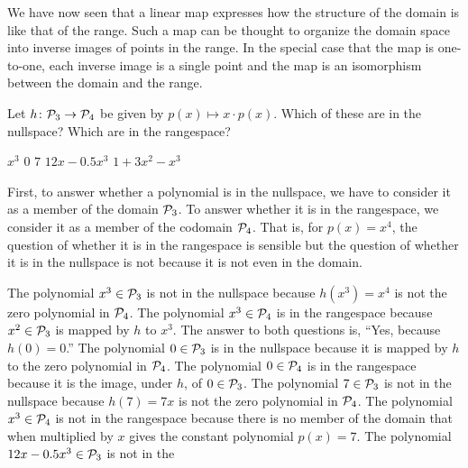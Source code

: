 We have now seen that a linear map
expresses how the structure of the domain is like that of the range.
Such a map can be thought to organize the domain space into
inverse images of points in the range.
In the special case that the map is one-to-one, each inverse image is a single
point and the map is an isomorphism between the domain and the range.


\begin{exercises}
  \recommended \item 
    Let \( \mbox{$h\colon \mathcal{P}_3\to \mathcal{P}_4$} \) be
    given by \( p(x)\mapsto x\cdot p(x) \).
    Which of these are in the nullspace?
    Which are in the rangespace?
    \begin{exparts*}
      \partsitem \( x^3 \)
      \partsitem \( 0 \)
      \partsitem \( 7 \)
      \partsitem \( 12x-0.5x^3 \)
      \partsitem \( 1+3x^2-x^3 \)
    \end{exparts*}
    \begin{answer}
      First, to answer whether a polynomial is in the nullspace, 
      we have to consider it as a member of the domain $\mathcal{P}_3$.
      To answer whether it is in the rangespace, we consider it as a member of
      the codomain $\mathcal{P}_4$.
      That is, for $p(x)=x^4$, the question of whether it is in the rangespace
      is sensible but the question of whether it is in the nullspace is not
      because it is not even in the domain.
      \begin{exparts}
        \partsitem The polynomial $x^3\in\mathcal{P}_3$ is not in the nullspace
            because $h(x^3)=x^4$ is not the zero polynomial in $\mathcal{P}_4$.
            The polynomial $x^3\in\mathcal{P}_4$ is in the rangespace because
            $x^2\in\mathcal{P}_3$ is mapped by $h$ to $x^3$.
        \partsitem The answer to both questions is, ``Yes, because 
            $h(0)=0$.''
            The polynomial $0\in\mathcal{P}_3$ is in the nullspace
            because it is mapped by $h$ to the zero polynomial in 
            $\mathcal{P}_4$.
            The polynomial $0\in\mathcal{P}_4$ is in the rangespace because
            it is the image, under $h$, of $0\in\mathcal{P}_3$.
        \partsitem The polynomial $7\in\mathcal{P}_3$ is not in the nullspace
            because $h(7)=7x$ is not the zero polynomial in $\mathcal{P}_4$.
            The polynomial $x^3\in\mathcal{P}_4$ is not in the rangespace 
            because there is no member of the domain that when multiplied 
            by $x$ gives the constant polynomial $p(x)=7$.
        \partsitem The polynomial $12x-0.5x^3\in\mathcal{P}_3$ is not in the 

\end{exparts}
\end{answer}
\end{exercises}
